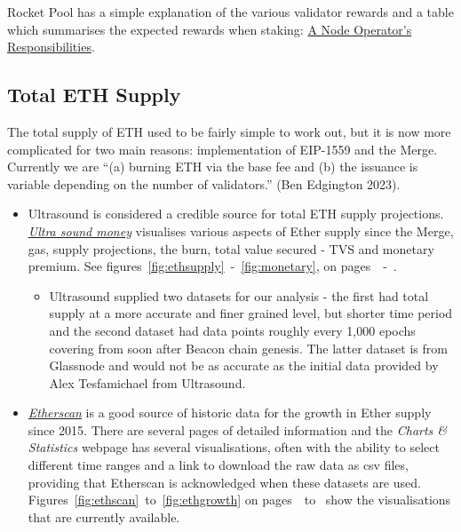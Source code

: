 \documentclass[UTF8]{article}
\begin{document}
Rocket Pool has a simple explanation of the various validator rewards and a table which summarises the expected rewards when staking: \href{https://docs.rocketpool.net/guides/node/responsibilities.html}{A Node Operator's Responsibilities}.
\clearpage
 \subsection{Total ETH Supply}
\label{sec:ethsupply} 
        The total supply of ETH used to be fairly simple to work out, but it is now more complicated for two main reasons:  implementation of EIP-1559 and the Merge.
Currently we are ``(a) burning ETH via the base fee and (b) the issuance is variable depending on the number of validators.'' (Ben Edgington 2023). 
\begin{itemize}
	\item Ultrasound is considered a credible source for total ETH supply projections. \\\textit{\href{https://ultrasound.money/}{Ultra sound money}} visualises various aspects of Ether supply since the Merge, gas, supply projections, the burn, total value secured - TVS and monetary premium. See figures~\ref{fig:ethsupply}~-~\ref{fig:monetary}, on pages~\pageref{fig:ethsupply}~-~\pageref{fig:monetary}.  

\begin{itemize}
	\item Ultrasound supplied two datasets for our analysis - the first had total supply at a more accurate and finer grained level, but shorter time period and the second dataset had data points roughly every 1,000 epochs covering from soon after Beacon chain genesis. The latter dataset is from Glassnode and would not be as accurate as the initial data provided by Alex Tesfamichael from Ultrasound.
\end{itemize}
	\item \textit{\href{https://etherscan.io/chart/ethersupplygrowth}{Etherscan}} is a good source of historic data for the growth in Ether supply since 2015. There are several pages of detailed information and the \textit{Charts \& Statistics} webpage has several visualisations, often with the ability to select different time ranges and a link to download the raw data as csv files, providing that Etherscan is acknowledged when these datasets are used.\\
	Figures~\ref{fig:ethscan}~to~\ref{fig:ethgrowth} on pages~\pageref{fig:ethscan}~to~\pageref{fig:ethgrowth} show the visualisations that are currently available.
\end{itemize}
\end{document}
